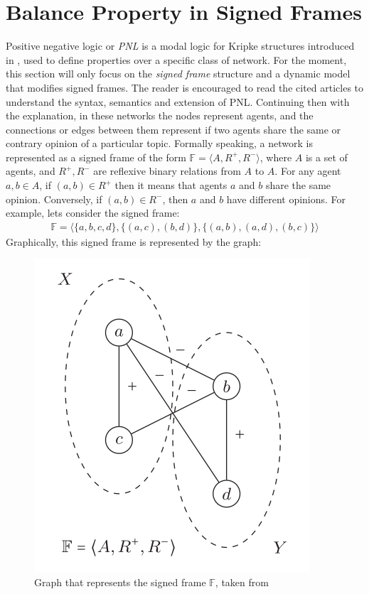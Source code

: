 \section{Balance Property in Signed Frames}
Positive negative logic or \textit{PNL} is a modal logic for Kripke structures introduced in \cite{PNL1, PNL2}, used to define properties over a specific class of network. For the moment, this section will only focus on the \textit{signed frame} structure and a dynamic model that modifies signed frames. The reader is encouraged to read the cited articles to understand the syntax, semantics and extension of PNL. Continuing then with the explanation, in these networks the nodes represent agents, and the connections or edges between them represent if two agents share the same or contrary opinion of a particular topic. Formally speaking, a network is represented as a signed frame of the form $\mathbb{F} = \langle A, R^+, R^- \rangle$, where $A$ is a set of agents, and $R^+,R^-$ are reflexive binary relations from $A$ to $A$. For any agent $a,b \in A$, if $(a,b) \in R^+$ then it means that agents $a$ and $b$ share the same opinion. Conversely, if $(a,b) \in R^-$, then $a$ and $b$ have different opinions. For example, lets consider the signed frame:
\begin{align*}
    \mathbb{F} = \langle \{a,b,c,d\}, \{(a,c),(b,d)\},\{(a,b),(a,d), (b,c)\} \rangle
\end{align*}
Graphically, this signed frame is represented by the graph:
\begin{figure}[H]
    \centering
    \includegraphics[scale = 0.5]{images/CS10.png}
    \caption{Graph that represents the signed frame $\mathbb{F}$, taken from \cite{PNL1}}
    \label{fig:CS10}
\end{figure}
